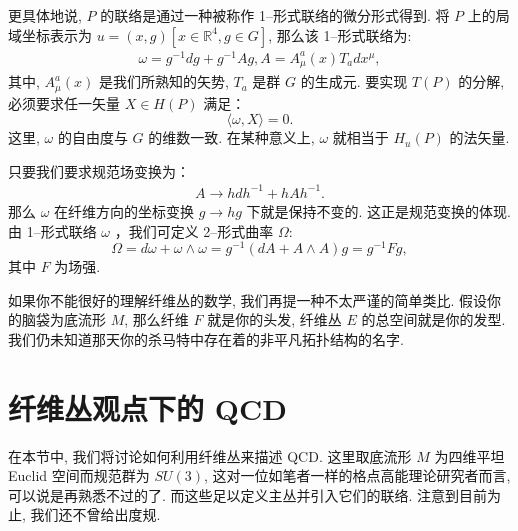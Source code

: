 \documentclass{article}
\begin{document}
\par 更具体地说, $P$ 的联络是通过一种被称作 1--形式联络的微分形式得到. 将 $P$ 上的局域坐标表示为 $u =(x, g)[x\in \mathbb{R}^{4}, g\in G]$, 那么该 1--形式联络为:
\begin{align}
\omega = g^{-1}dg+g^{-1}Ag, A=A_{\mu}^{a}(x)T_{a}dx^{\mu},
\end{align}
其中, $A_{\mu}^{a}(x)$ 是我们所熟知的矢势, $T_{a}$ 是群 $G$ 的生成元. 要实现 $T(P)$ 的分解, 必须要求任一矢量 $X \in H(P)$ 满足：
\begin{equation}
\langle \omega, X\rangle=0.
\end{equation}
这里, $\omega$ 的自由度与 $G$ 的维数一致. 在某种意义上, $\omega$ 就相当于 $H_{u}(P)$ 的法矢量.

\par 只要我们要求规范场变换为：
\begin{align}
A \rightarrow hdh^{-1}+hAh^{-1}.
\end{align}
那么 $\omega$ 在纤维方向的坐标变换 $g \rightarrow hg$ 下就是保持不变的. 这正是规范变换的体现. 由 1--形式联络 $\omega$ ，我们可定义 2--形式曲率 $\Omega$:
\begin{equation}
\Omega=d\omega+\omega\wedge \omega=g^{-1}(dA+A\wedge A)g=g^{-1}Fg,
\end{equation}
其中 $F$ 为场强.

\par 如果你不能很好的理解纤维丛的数学, 我们再提一种不太严谨的简单类比. 假设你的脑袋为底流形 $M$, 那么纤维 $F$ 就是你的头发, 纤维丛 $E$ 的总空间就是你的发型. 我们仍未知道那天你的杀马特中存在着的非平凡拓扑结构的名字.
\section{纤维丛观点下的 QCD}
在本节中, 我们将讨论如何利用纤维丛来描述 QCD. 这里取底流形 $M$ 为四维平坦 Euclid 空间而规范群为 $SU(3)$, 这对一位如笔者一样的格点高能理论研究者而言, 可以说是再熟悉不过的了. 而这些足以定义主丛并引入它们的联络. 注意到目前为止, 我们还不曾给出度规.
\end{document}
